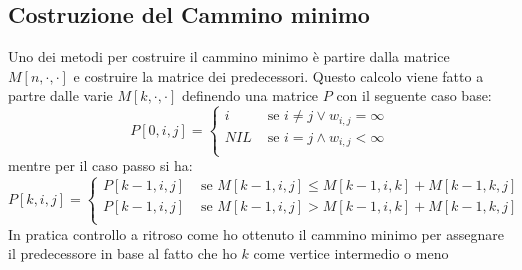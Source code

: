 \documentclass[a4paper,12pt, oneside]{book}
\begin{document}
\subsection{Costruzione del Cammino minimo}
Uno dei metodi per costruire il cammino minimo è partire dalla matrice
$M[n,\cdot, \cdot]$ e costruire la matrice dei predecessori. Questo
calcolo viene fatto a partre dalle varie $M[k,\cdot,\cdot]$ definendo
una matrice $P$ con il seguente caso base:
\[P[0,i,j]=
  \begin{cases}
    i & \mbox{ se }i\neq j\vee w_{i,j}=\infty\\
    NIL & \mbox{ se }i= j\wedge w_{i,j}<\infty\\
  \end{cases}
\]
mentre per il caso passo si ha:
\[P[k,i,j]=
  \begin{cases}
    P[k-1,i,j] & \mbox{ se }M[k-1,i,j]\leq M[k-1,i,k]+M[k-1,k,j]\\ 
    P[k-1,i,j] & \mbox{ se }M[k-1,i,j]> M[k-1,i,k]+M[k-1,k,j]\\
  \end{cases}
\]
In pratica controllo a ritroso come ho ottenuto il cammino minimo per
assegnare il predecessore in base al fatto che ho $k$ come vertice
intermedio o meno
\end{document}
